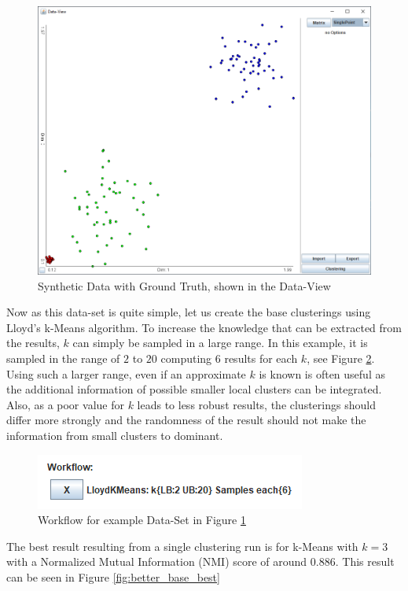 \documentclass[
	a4paper,
	english,
	twoside,
	openright,               
	11pt                            
	]{report}
\begin{document}
\begin{figure}[h]
	\centering
	\includegraphics[scale=.5]{better_base}
	\caption{Synthetic Data with Ground Truth, shown in the Data-View}
	\label{fig:better_base}
\end{figure}

Now as this data-set is quite simple, let us create the base clusterings using Lloyd's k-Means algorithm. To increase the knowledge that can be extracted from the results, $k$ can simply be sampled in a large range. In this example, it is sampled in the range of $2$ to $20$ computing $6$ results for each $k$, see Figure \ref{fig:better_base_wf}. Using such a larger range, even if an approximate $k$ is known is often useful as the additional information of possible smaller local clusters can be integrated. Also, as a poor value for $k$ leads to less robust results, the clusterings should differ more strongly and the randomness of the result should not make the information from small clusters to dominant.

\begin{figure}[h]
	\centering
	\includegraphics[scale=.75]{better_base_wf}
	\caption{Workflow for example Data-Set in Figure \ref{fig:better_base}}
	\label{fig:better_base_wf}
\end{figure}

The best result resulting from a single clustering run is for k-Means with $k=3$ with a Normalized Mutual Information (NMI) score of around $0.886$. This result can be seen in Figure \ref{fig:better_base_best} 
\end{document}
